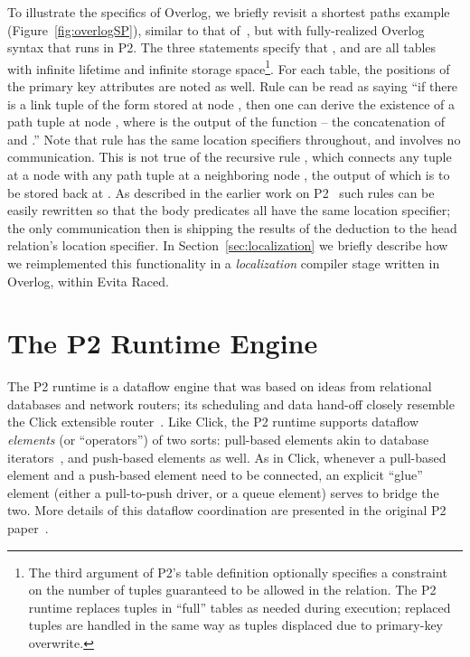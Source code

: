         To illustrate the specifics of Overlog, we briefly revisit a shortest
        paths example (Figure~\ref{fig:overlogSP}), similar to that
        of~\cite{loo-sigmod06}, but with fully-realized Overlog syntax that runs
        in P2.  The three  statements specify that ,
         and  are all tables with infinite lifetime and
        infinite storage space\footnote{The third argument of P2's table
          definition optionally specifies a constraint on the number of tuples
          guaranteed to be allowed in the relation. The P2 runtime replaces
          tuples in ``full'' tables as needed during execution; replaced tuples
          are handled in the same way as tuples displaced due to primary-key overwrite.}.  
        For each table, the positions of the primary key attributes are noted as well.  
        Rule  can be read as saying ``if there is a link tuple of the form  stored at node , then one can derive the existence of a path tuple  at node , where  is the output of the function  -- the concatenation of  and .''  
Note that rule  has the same location specifiers throughout, and
        involves no communication.  This is not true of the recursive
        rule , which connects any  tuple at a node
         with any path tuple at a neighboring node , the
        output of which is to be stored back at . As described in
        the earlier work on P2~\cite{loo-sigcomm05,loo-sigmod06} such
        rules can be easily rewritten so that the body predicates all
        have the same location specifier; the only communication then is
        shipping the results of the deduction to the head relation's
        location specifier.  In Section~\ref{sec:localization} we
        briefly describe how we reimplemented this functionality in a
        \emph{localization} compiler stage written in Overlog, within
        Evita Raced.


\section{The P2 Runtime Engine}
The P2 runtime is a dataflow engine that was based on ideas from relational databases and network routers; its scheduling and data hand-off closely resemble the Click extensible router~\cite{click-tocs}.  Like Click, the P2 runtime supports dataflow {\em elements} (or ``operators'') of two sorts: pull-based elements akin to database iterators~\cite{graefe-survey}, and push-based elements as well.  As in Click, whenever a pull-based element and a push-based element need to be connected, an explicit ``glue'' element (either a pull-to-push driver, or a queue element) serves to bridge the two.  More details of this dataflow coordination are presented in the original P2 paper~\cite{p2:sosp}.

